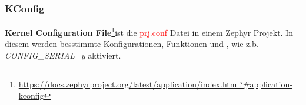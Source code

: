         
        
        

    \subsubsection{KConfig}
    \textbf{Kernel Configuration File}\footnote{\url{https://docs.zephyrproject.org/latest/application/index.html?\#application-kconfig}}ist die \textcolor{red}{prj.conf} Datei in einem 
    Zephyr Projekt. In diesem werden besstimmte Konfigurationen, Funktionen und , wie z.b. \textit{CONFIG\_SERIAL=y} aktiviert. 

\newpage
